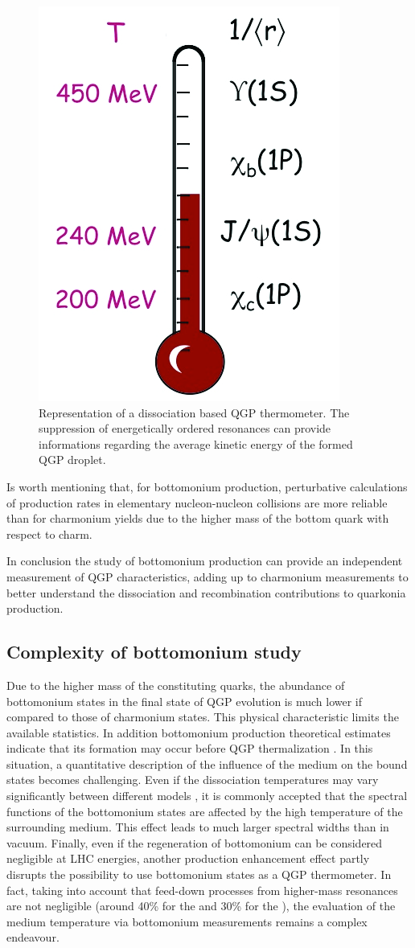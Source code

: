 \begin{figure}[!t]
\begin{center}
\includegraphics[width=0.3\linewidth]{Chapters/Analysis/Figs/QGP_thermometer.png}
\caption{Representation of a dissociation based QGP thermometer. The suppression of energetically ordered resonances can provide informations regarding the average kinetic energy of the formed QGP droplet.}
\label{fig:QGP_thermo}
\end{center}
\end{figure}

Is worth mentioning that, for bottomonium production, perturbative calculations of production rates in elementary nucleon-nucleon collisions are more reliable than for charmonium yields due to the higher mass of the bottom quark with respect to charm. 

In conclusion the study of bottomonium production can provide an independent measurement of QGP characteristics, adding up to charmonium measurements to better understand the dissociation and recombination contributions to quarkonia production.

\subsection{Complexity of bottomonium study}
Due to the higher mass of the constituting quarks, the abundance of bottomonium states in the final state of QGP evolution is much lower if compared to those of charmonium states.
This physical characteristic limits the available statistics.
In addition bottomonium production theoretical estimates \cite{Krouppa:2015yoa} indicate that its formation may occur before QGP thermalization \cite{Mauricio:2007vz}. 
In this situation, a quantitative description of the influence of the medium on the bound states becomes challenging.
Even if the dissociation temperatures may vary significantly between different models \cite{Brambilla:2010cs,Andronic:2015wma}, it is commonly accepted \cite{Burnier:2014ssa} that the spectral functions of the bottomonium states are affected by the high temperature of the surrounding medium.
This effect leads to much larger spectral widths than in vacuum.
Finally, even if the regeneration of bottomonium can be considered negligible at LHC energies, another production enhancement effect partly disrupts the possibility to use bottomonium states as a QGP thermometer. 
In fact, taking into account that feed-down processes from higher-mass resonances  are not negligible (around 40\% for the \upsis and 30\% for the \upsiss \cite{Andronic:2015wma}), the evaluation of the medium temperature via bottomonium measurements remains a complex endeavour.

